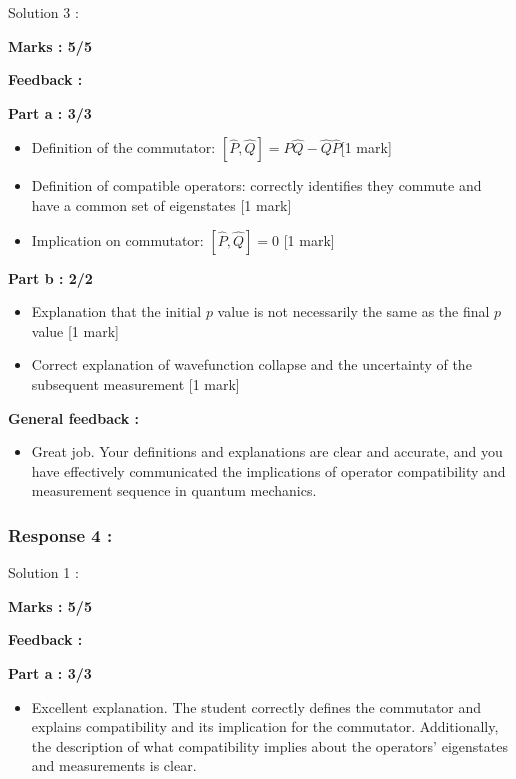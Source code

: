 \documentclass[a4paper,11pt]{article}
\begin{document}
Solution 3 :

\textbf{Marks : 5/5}

\textbf{Feedback : }

\textbf{Part a : 3/3}

\begin{itemize}
    \item Definition of the commutator: $[\hat{P},\hat{Q}] = \hat{P}\hat{Q} - \hat{Q}\hat{P}$[1 mark]
    \item Definition of compatible operators: correctly identifies they commute and have a common set of eigenstates [1 mark]
    \item Implication on commutator: $[\hat{P},\hat{Q}] = 0$ [1 mark]
\end{itemize}

\textbf{Part b : 2/2}

\begin{itemize}
    \item Explanation that the initial $p$ value is not necessarily the same as the final $p$ value [1 mark]
    \item Correct explanation of wavefunction collapse and the uncertainty of the subsequent measurement [1 mark]
\end{itemize}

\textbf{General feedback :}

\begin{itemize}
    \item Great job. Your definitions and explanations are clear and accurate, and you have effectively communicated the implications of operator compatibility and measurement sequence in quantum mechanics.
\end{itemize}


\subsubsection*{Response 4 :} 

Solution 1 :

\textbf{Marks : 5/5}

\textbf{Feedback : }

\textbf{Part a : 3/3}

\begin{itemize}
    \item Excellent explanation. The student correctly defines the commutator and explains compatibility and its implication for the commutator. Additionally, the description of what compatibility implies about the operators' eigenstates and measurements is clear.
\end{itemize}
\end{document}
